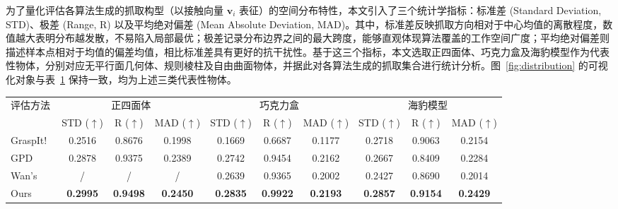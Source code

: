 为了量化评估各算法生成的抓取构型（以接触向量 $\mathbf{v}_i$ 表征）的空间分布特性，本文引入了三个统计学指标：标准差 (Standard Deviation, STD)、极差 (Range, R) 以及平均绝对偏差 (Mean Absolute Deviation, MAD)。其中，标准差反映抓取方向相对于中心均值的离散程度，数值越大表明分布越发散，不易陷入局部最优；极差记录分布边界之间的最大跨度，能够直观体现算法覆盖的工作空间广度；平均绝对偏差则描述样本点相对于均值的偏差均值，相比标准差具有更好的抗干扰性。基于这三个指标，本文选取正四面体、巧克力盒及海豹模型作为代表性物体，分别对应无平行面几何体、规则棱柱及自由曲面物体，并据此对各算法生成的抓取集合进行统计分析。图~\ref{fig:distribution} 的可视化对象与表~\ref{tab:distribution_metrics} 保持一致，均为上述三类代表性物体。

\begin{table}[htbp]
    \centering
    \small
    \setlength{\tabcolsep}{3pt}
    \label{tab:distribution_metrics}
    \begin{threeparttable}
    \begin{tabular}{lccc ccc ccc}
        \toprule
        \multirow{2}{*}{评估方法} & \multicolumn{3}{c}{正四面体} & \multicolumn{3}{c}{巧克力盒} & \multicolumn{3}{c}{海豹模型} \\
        \cmidrule(lr){2-4} \cmidrule(lr){5-7} \cmidrule(lr){8-10}
         & STD ($\uparrow$) & R ($\uparrow$) & MAD ($\uparrow$) & STD ($\uparrow$) & R ($\uparrow$) & MAD ($\uparrow$) & STD ($\uparrow$) & R ($\uparrow$) & MAD ($\uparrow$) \\
        \midrule
        GraspIt!~\cite{miller_graspit_2021} & 0.2516 & 0.8676 & 0.1998 & 0.1669 & 0.6687 & 0.1177 & 0.2718 & 0.9063 & 0.2154 \\
        GPD~\cite{tenpas_grasp_2017} & 0.2878 & 0.9375 & 0.2389 & 0.2742 & 0.9454 & 0.2162 & 0.2667 & 0.8409 & 0.2284 \\
        Wan's~\cite{wan_planning_2021} & / & / & / & 0.2639 & 0.9365 & 0.2002 & 0.2427 & 0.8690 & 0.2014 \\
        Ours & \textbf{0.2995} & \textbf{0.9498} & \textbf{0.2450} & \textbf{0.2835} & \textbf{0.9922} & \textbf{0.2193} & \textbf{0.2857} & \textbf{0.9154} & \textbf{0.2429} \\
        \bottomrule
    \end{tabular}
    \end{threeparttable}
\end{table}


